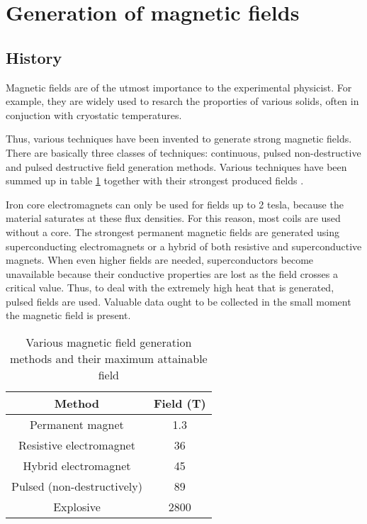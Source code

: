 \section{Generation of magnetic fields}
\subsection{History}

Magnetic fields are of the utmost importance to the experimental physicist.  
For example, they are widely used to resarch the proporties of various 
solids, often in conjuction with cryostatic temperatures.

Thus, various techniques have been invented to generate strong magnetic 
fields.  There are basically three classes of techniques: continuous, 
pulsed non-destructive and pulsed destructive field generation methods.  
Various techniques have been summed up in table \ref{methodTable} together 
with their strongest produced fields \cite{highPulsedMagnet} 
\cite{recordField}.

Iron core electromagnets can only be used for fields up to 2 tesla, because the 
material saturates at these flux densities. For this reason, most coils are 
used without a core. The strongest permanent magnetic fields are generated 
using superconducting electromagnets or a hybrid of both resistive and 
superconductive magnets. When even higher fields are needed, 
superconductors become unavailable because their conductive properties are 
lost as the field crosses a critical value. Thus, to deal with the 
extremely high heat that is generated, pulsed fields are used. Valuable 
data ought to be collected in the small moment the magnetic field is 
present. \cite{herlach} 

\begin{table}
\begin{center}
\caption{Various magnetic field generation methods and their maximum 
attainable field}
\label{methodTable}
\begin{tabular}{c|c}
Method & Field (T) \\
\hline
Permanent magnet & 1.3\\
Resistive electromagnet & 36\\
Hybrid electromagnet & 45\\
Pulsed (non-destructively) & 89\\
Explosive & 2800 \\
\end{tabular}
\end{center}
\end{table}

